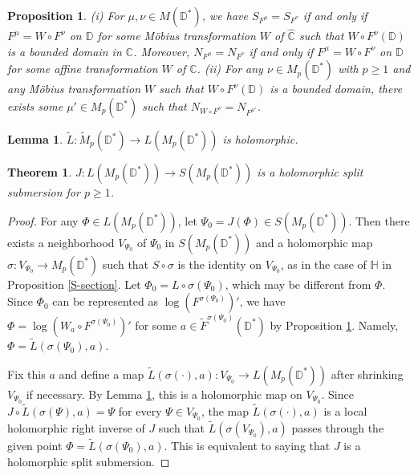 \documentclass[10pt,a4paper]{amsart}
\newtheorem{proposition}{Proposition}
\newtheorem{lemma}{Lemma}
\newtheorem{theorem}{Theorem}
\begin{document}
\begin{proposition}\label{affine}
{\rm (i)}
For $\mu, \nu \in M(\mathbb D^*)$, we have $S_{F^{\mu}}=S_{F^{\nu}}$ if and only if  
$F^{\mu}=W \circ F^{\nu}$ on $\mathbb D$
for some M\"obius transformation $W$ of $\widehat{\mathbb C}$ such that  
$W \circ F^{\nu}(\mathbb D)$ is a bounded domain in $\mathbb C$. Moreover, $N_{F^{\mu}}=N_{F^{\nu}}$ if and only if
$F^{\mu}=W \circ F^{\nu}$ on $\mathbb D$
for some affine transformation $W$ of $\mathbb C$.
{\rm (ii)}
For any $\nu \in M_p(\mathbb D^*)$ with $p \geq 1$ and any M\"obius transformation $W$ 
such that $W \circ F^{\nu}(\mathbb D)$ is a bounded domain,  
there exists some $\mu' \in M_p(\mathbb D^*)$ such that $N_{W \circ F^{\nu}}=N_{F^{\mu'}}$. 
\end{proposition}

\begin{lemma}\label{localbound}
$\widetilde L:\widetilde M_p(\mathbb D^*) \to L(M_p(\mathbb D^*))$ is holomorphic.
\end{lemma}

\begin{theorem}\label{bundle}
$J:L(M_p(\mathbb D^*)) \to S(M_p(\mathbb D^*))$ is a holomorphic split submersion for $p \geq 1$. 
\end{theorem}

\begin{proof}
For any $\Phi \in L(M_p(\mathbb D^*))$, let $\Psi_0=J(\Phi) \in S(M_p(\mathbb D^*))$. Then
there exists a
neighborhood $V_{\Psi_0}$ of $\Psi_0$ in $S(M_p(\mathbb D^*))$ 
and a holomorphic map $\sigma:V_{\Psi_0} \to M_p(\mathbb D^*)$ such that
$S \circ \sigma$ is the identity on $V_{\Psi_0}$, as in the case of 
$\mathbb H$ in Proposition \ref{S-section}. Let $\Phi_0=L \circ \sigma(\Psi_0)$, which may be different 
from $\Phi$.
Since $\Phi_0$ can be represented as $\log (F^{\sigma(\Psi_0)})'$, we have
$\Phi=\log (W_a \circ F^{\sigma(\Psi_0)})'$ for some $a \in \widetilde F^{\sigma(\Psi_0)}(\mathbb D^*)$
by Proposition \ref{affine}. 
Namely, $\Phi=\widetilde L(\sigma(\Psi_0),a)$.

Fix this $a$ and define a map
$\widetilde L(\sigma(\cdot),a):V_{\Psi_0} \to L(M_p(\mathbb D^*))$ after shrinking $V_{\Psi_0}$ if necessary.
By Lemma \ref{localbound}, this is a holomorphic map on $V_{\Psi_0}$.
Since $J \circ \widetilde L(\sigma(\Psi),a)=\Psi$ for every $\Psi \in V_{\Psi_0}$, the map
$\widetilde L(\sigma(\cdot),a)$ is a local holomorphic right inverse of $J$ such that $\widetilde L(\sigma(V_{\Psi_0}),a)$ passes through the given 
point $\Phi=\widetilde L(\sigma(\Psi_0),a)$.
This is equivalent to saying that $J$ is a holomorphic split submersion.
\end{proof}
\end{document}

